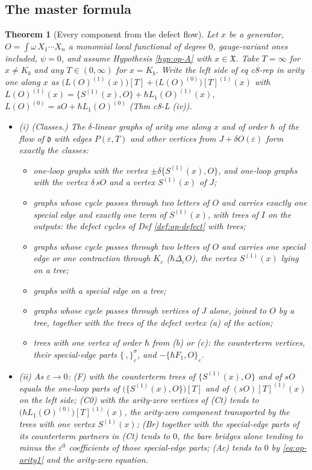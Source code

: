 \documentclass[11pt]{article}
\numberwithin{equation}{section}
\theoremstyle{plain}
\newtheorem{theorem}{Theorem}[section]
\theoremstyle{definition}
\begin{document}
\subsection{The master formula}

\begin{theorem}[Every component from the defect flow]
\label{thm:op-master}
Let $x$ be a generator, $O=\int\omega\,X_1\cdots X_n$ a monomial local functional of degree $0$, gauge-variant ones included, $\psi=0$, and assume Hypothesis \ref{hyp:op-A} with $x\in\mathfrak X$. Take $T=\infty$ for $x\ne K_b$ and any $T\in(0,\infty)$ for $x=K_b$. Write the left side of eq c8-rep in arity one along $x$ as $\big(L(O)^{(1)}(x)\big)[T]+\big(L(O)^{(0)}\big)[T]^{(1)}(x)$ with $L(O)^{(1)}(x)=\{S^{(1)}(x),O\}+\hbar L_1(O)^{(1)}(x)$, $L(O)^{(0)}=sO+\hbar L_1(O)^{(0)}$ (Thm c8-L (iv)).
\begin{itemize}
\item (i) (Classes.) The $\delta$-linear graphs of arity one along $x$ and of order $\hbar$ of the flow of $\mathfrak d$ with edges $P(\varepsilon,T)$ and other vertices from $J+\delta O(\varepsilon)$ form exactly the classes:
\begin{itemize}
\item[(F)] one-loop graphs with the vertex $\pm\delta\{S^{(1)}(x),O\}$, and one-loop graphs with the vertex $\delta\,sO$ and a vertex $S^{(1)}(x)$ of $J$;
\item[(C2)] graphs whose cycle passes through two letters of $O$ and carries exactly one special edge and exactly one term of $S^{(1)}(x)$, with trees of $I$ on the outputs: the defect cycles of Def \ref{def:op-defect} with trees;
\item[(C0)] graphs whose cycle passes through two letters of $O$ and carries one special edge or one contraction through $K_\varepsilon$ ($\hbar\Delta_\varepsilon O$), the vertex $S^{(1)}(x)$ lying on a tree;
\item[(Br)] graphs with a special edge on a tree;
\item[(Ac)] graphs whose cycle passes through vertices of $J$ alone, joined to $O$ by a tree, together with the trees of the defect vertex (a) of the action;
\item[(Ct)] trees with one vertex of order $\hbar$ from (b) or (c): the counterterm vertices, their special-edge parts $\{\,,\}^\sigma_\varepsilon$, and $-\{\hbar F_1,O\}_\varepsilon$.
\end{itemize}
\item (ii) As $\varepsilon\to0$: (F) with the counterterm trees of $\{S^{(1)}(x),O\}$ and of $sO$ equals the one-loop parts of $\big(\{S^{(1)}(x),O\}\big)[T]$ and of $(sO)[T]^{(1)}(x)$ on the left side; (C0) with the arity-zero vertices of (Ct) tends to $\big(\hbar L_1(O)^{(0)}\big)[T]^{(1)}(x)$, the arity-zero component transported by the trees with one vertex $S^{(1)}(x)$; (Br) together with the special-edge parts of its counterterm partners in (Ct) tends to $0$, the bare bridges alone tending to minus the $\varepsilon^0$ coefficients of those special-edge parts; (Ac) tends to $0$ by \eqref{eq:op-arity1} and the arity-zero equation.

\end{itemize}
\end{theorem}
\end{document}

